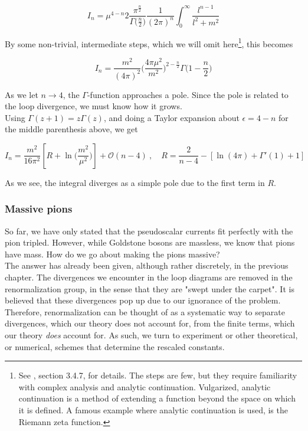 \documentclass[10pt,twoside]{report}
\begin{document}
	\begin{equation}
		I_n = \mu^{4-n}2\frac{\pi^{\frac{n}{2}}}{\Gamma\big(\frac{n}{2}\big)}\frac{1}{(2\pi)^n}\int_0^\infty \frac{l^{n-1}}{l^2 + m^2}
	\end{equation}
	
	By some non-trivial, intermediate steps, which we will omit here\footnote{See \cite{SchererSchingler12}, section 3.4.7, for details. The steps are few, but they require familiarity with complex analysis and analytic continuation. Vulgarized, analytic continuation is a method of extending a function beyond the space on which it is defined. A famous example where analytic continuation is used, is the Riemann zeta function.}, this becomes
	
	\begin{equation}
		I_n =\frac{m^2}{(4\pi)^2}\Big(\frac{4\pi\mu^2}{m^2}\Big)^{2-\frac{n}{2}}\Gamma\big(1-\frac{n}{2}\big)
	\end{equation}
	
	As we let $n\rightarrow4$, the $\Gamma$-function approaches a pole. Since the pole is related to the loop divergence, we must know how it grows.\\
	
	Using $\Gamma(z+1) = z\Gamma(z)$, and doing a Taylor expansion about $\epsilon = 4-n$ for the middle parenthesis above, we get \cite{SchererSchingler12}
	
	\begin{equation}
		I_n = \frac{m^2}{16\pi^2}\left[ R + \ln\Big(\frac{m^2}{\mu^2}\Big)\right] + \mathcal{O}(n-4)\:,\quad R=\frac{2}{n-4}-[\ln(4\pi) + \Gamma'(1)+1]
	\end{equation}
	
	As we see, the integral diverges as a simple pole due to the first term in $R$.
	
	\subsubsection{Massive pions}
	So far, we have only stated that the pseudoscalar currents fit perfectly with the pion tripled. However, while Goldstone bosons are massless, we know that pions have mass. How do we go about making the pions massive?\\
	
	The answer has already been given, although rather discretely, in the previous chapter. The divergences we encounter in the loop diagrams are removed in the renormalization group, in the sense that they are "swept under the carpet". It is believed that these divergences pop up due to our ignorance of the problem. Therefore, renormalization can be thought of as a systematic way to separate divergences, which our theory does not account for, from the finite terms, which our theory \emph{does} account for. As such, we turn to experiment or other theoretical, or numerical, schemes that determine the rescaled constants.\\
	
\end{document}
